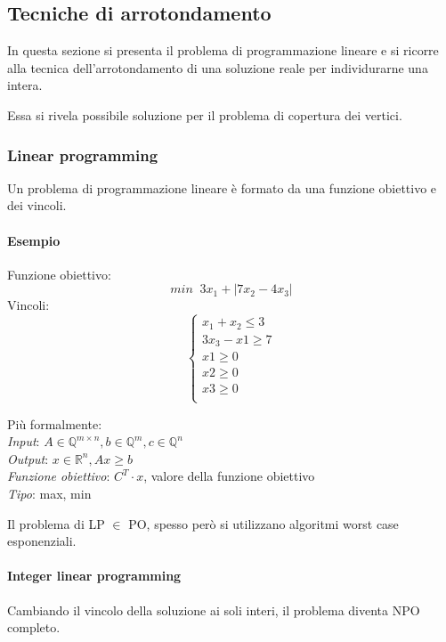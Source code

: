 \subsection{Tecniche di arrotondamento}
In questa sezione si presenta il problema di programmazione lineare e si 
ricorre alla tecnica dell'arrotondamento di una soluzione reale per 
individurarne una intera.

Essa si rivela possibile soluzione per il problema di copertura dei vertici.

\subsubsection{Linear programming}
Un problema di programmazione lineare è formato da una funzione obiettivo e dei vincoli.
\paragraph{Esempio}
Funzione obiettivo: $$\mathit{min}\;\;3x_1 + |7x_2 - 4x_3|$$
Vincoli:
\[ 
    \begin{cases}
        x_1 + x_2 \leq 3\\
        3x_3 - x1 \geq 7\\
        x1 \geq 0\\
        x2 \geq 0\\
        x3 \geq 0\\
    \end{cases}
\]

Più formalmente:\\
\emph{Input}: $A \in \mathbb{Q}^{m\times n}, b \in \mathbb{Q}^m, c \in \mathbb{Q}^n$\\
\emph{Output}: $x \in \mathbb{R}^n, Ax \geq b$\\
\emph{Funzione obiettivo}: $C^T \cdot x$, valore della funzione obiettivo\\
\emph{Tipo}: max, min\\

\begin{remark}
    Il problema di  LP $\in $ PO, spesso però si utilizzano
    algoritmi worst case esponenziali.
\end{remark}

\paragraph{Integer linear programming}
Cambiando il vincolo della soluzione ai soli interi, il problema diventa NPO completo.

